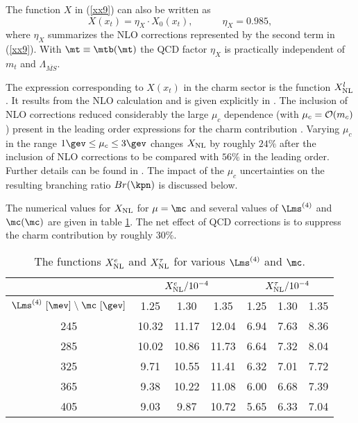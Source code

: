 The function $X$ in (\ref{xx9})
can also be written as
\begin{equation}\label{xeta9}
X(x_t)=\eta_X\cdot X_0(x_t), \qquad\quad \eta_X=0.985,
\end{equation}
where $\eta_X$ summarizes the NLO corrections represented by the second
term in (\ref{xx9}).
With $\mt\equiv \mtb(\mt)$ the QCD factor $\eta_X$
is practically independent of $m_t$ and $\Lambda_{\overline{MS}}$.

The expression corresponding to $X(x_t)$ in the charm sector is the function
$X^l_{\rm NL}$. It results from the NLO calculation \cite{BB3} and is given
explicitly in \cite{BB3,BBL}.
The inclusion of NLO corrections reduced considerably the large
$\mu_c$ dependence
(with $\mu_c={\cal O}(m_c)$) present in the leading order expressions
for the charm contribution
 \cite{novikovetal:77,ellishagelin:83,dibetal:91,PBE0}.
Varying $\mu_c$ in the range $1\gev\le\mu_c\le 3\gev$ changes $X_{\rm NL}$
by roughly $24\%$ after the inclusion of NLO corrections to be compared
with $56\%$ in the leading order. Further details can be found in
\cite{BB3,BBL}. The impact of the $\mu_c$ uncertainties on the
resulting branching ratio $Br(\kpn)$ is discussed below.

The
numerical values for $X_{\rm NL}$ for $\mu = \mc$ and several values of
$\Lms^{(4)}$ and $\mc(\mc)$ are given in table \ref{tab:xnlnum}. 
The net effect of QCD corrections is to suppress the charm contribution
by roughly $30\%$.

\begin{table}[htb]
\caption[]{The functions $X^e_{\rm NL}$ and $X^\tau_{\rm NL}$
for various $\Lms^{(4)}$ and $\mc$.
\label{tab:xnlnum}}
\begin{center}
\begin{tabular}{|c|c|c|c|c|c|c|}
\hline
& \multicolumn{3}{c|}{$X^e_{\rm NL}/10^{-4}$} &
  \multicolumn{3}{c|}{$X^\tau_{\rm NL}/10^{-4}$} \\
\hline
$\Lms^{(4)}\ [\mev]\;\backslash\;\mc\ [\gev]$ &
1.25 & 1.30 & 1.35 & 1.25 & 1.30 & 1.35 \\
\hline
245 & 10.32  & 11.17  & 12.04 & 6.94 & 7.63 & 8.36 \\
285 & 10.02  & 10.86  & 11.73 & 6.64 & 7.32 & 8.04 \\
325 &  9.71  & 10.55  & 11.41 & 6.32 & 7.01 & 7.72 \\
365 &  9.38  & 10.22  & 11.08 & 6.00 & 6.68 & 7.39 \\
405 &  9.03  &  9.87  & 10.72 & 5.65 & 6.33 & 7.04 \\
\hline
\end{tabular}
\end{center}
\end{table}

